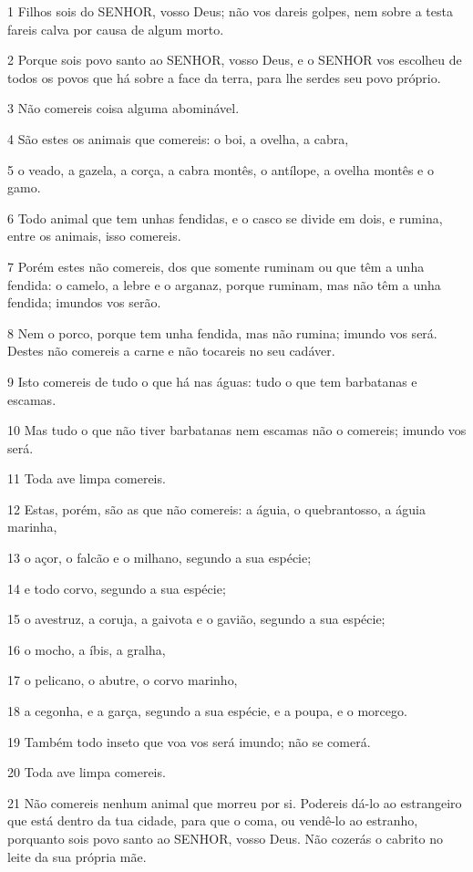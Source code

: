 \par 1 Filhos sois do SENHOR, vosso Deus; não vos dareis golpes, nem sobre a testa fareis calva por causa de algum morto.
\par 2 Porque sois povo santo ao SENHOR, vosso Deus, e o SENHOR vos escolheu de todos os povos que há sobre a face da terra, para lhe serdes seu povo próprio.
\par 3 Não comereis coisa alguma abominável.
\par 4 São estes os animais que comereis: o boi, a ovelha, a cabra,
\par 5 o veado, a gazela, a corça, a cabra montês, o antílope, a ovelha montês e o gamo.
\par 6 Todo animal que tem unhas fendidas, e o casco se divide em dois, e rumina, entre os animais, isso comereis.
\par 7 Porém estes não comereis, dos que somente ruminam ou que têm a unha fendida: o camelo, a lebre e o arganaz, porque ruminam, mas não têm a unha fendida; imundos vos serão.
\par 8 Nem o porco, porque tem unha fendida, mas não rumina; imundo vos será. Destes não comereis a carne e não tocareis no seu cadáver.
\par 9 Isto comereis de tudo o que há nas águas: tudo o que tem barbatanas e escamas.
\par 10 Mas tudo o que não tiver barbatanas nem escamas não o comereis; imundo vos será.
\par 11 Toda ave limpa comereis.
\par 12 Estas, porém, são as que não comereis: a águia, o quebrantosso, a águia marinha,
\par 13 o açor, o falcão e o milhano, segundo a sua espécie;
\par 14 e todo corvo, segundo a sua espécie;
\par 15 o avestruz, a coruja, a gaivota e o gavião, segundo a sua espécie;
\par 16 o mocho, a íbis, a gralha,
\par 17 o pelicano, o abutre, o corvo marinho,
\par 18 a cegonha, e a garça, segundo a sua espécie, e a poupa, e o morcego.
\par 19 Também todo inseto que voa vos será imundo; não se comerá.
\par 20 Toda ave limpa comereis.
\par 21 Não comereis nenhum animal que morreu por si. Podereis dá-lo ao estrangeiro que está dentro da tua cidade, para que o coma, ou vendê-lo ao estranho, porquanto sois povo santo ao SENHOR, vosso Deus. Não cozerás o cabrito no leite da sua própria mãe.
